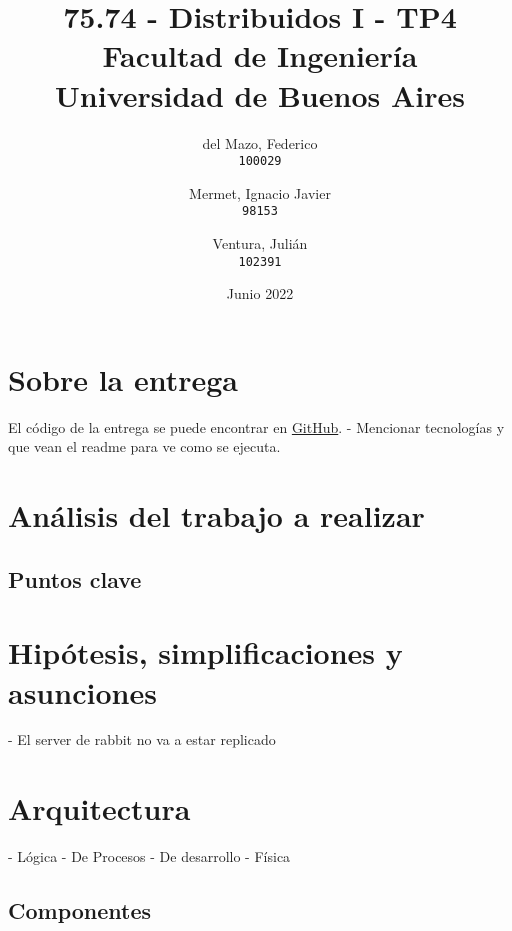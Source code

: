 \documentclass[titlepage,a4paper,oneside]{article}
\begin{document}
\begin{titlepage}
\title{
	75.74 \-- Distribuidos I \-- TP4\\
    \large Facultad de Ingeniería\\
	Universidad de Buenos Aires
}
\author{
	del Mazo, Federico\\
	\texttt{100029}
	\and
	Mermet, Ignacio Javier\\
	\texttt{98153}
	\and
	Ventura, Julián\\
	\texttt{102391}
}
\date{Junio 2022}

\maketitle

\end{titlepage}

\tableofcontents

\newpage

\section{Sobre la entrega}
El código de la entrega se puede encontrar en \href{https://github.com/CrossNox/7574-TP3}{GitHub}.
- Mencionar tecnologías y que vean el readme para ve como se ejecuta.

\section{Análisis del trabajo a realizar}

\subsection{Puntos clave}

\section{Hipótesis, simplificaciones y asunciones}
- El server de rabbit no va a estar replicado

\section{Arquitectura}
- Lógica
- De Procesos
- De desarrollo
- Física

\subsection{Componentes}
\end{document}

